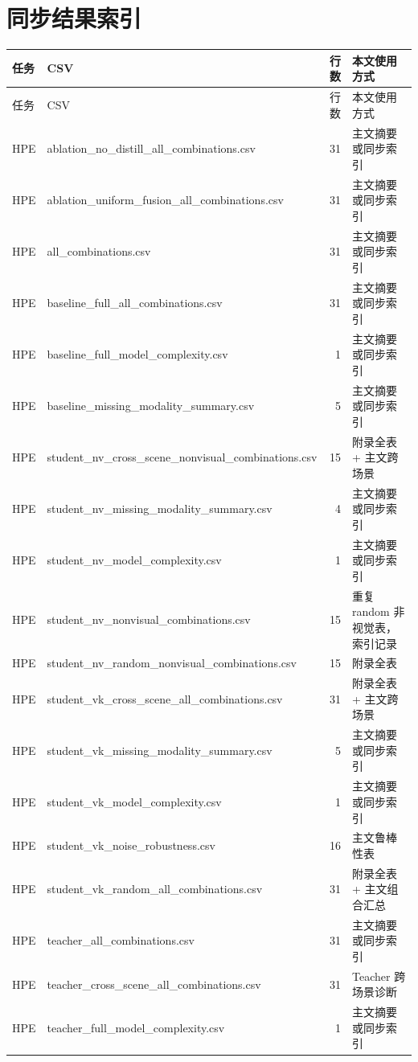 \documentclass[UTF8,10pt]{ctexart}
\begin{document}
\section{同步结果索引}
{\tiny
\begin{longtable}{llrl}
\toprule
任务 & CSV & 行数 & 本文使用方式\\
\midrule
\endfirsthead
\toprule
任务 & CSV & 行数 & 本文使用方式\\
\midrule
\endhead
HPE & ablation\_no\_distill\_all\_combinations.csv & 31 & 主文摘要或同步索引\\
HPE & ablation\_uniform\_fusion\_all\_combinations.csv & 31 & 主文摘要或同步索引\\
HPE & all\_combinations.csv & 31 & 主文摘要或同步索引\\
HPE & baseline\_full\_all\_combinations.csv & 31 & 主文摘要或同步索引\\
HPE & baseline\_full\_model\_complexity.csv & 1 & 主文摘要或同步索引\\
HPE & baseline\_missing\_modality\_summary.csv & 5 & 主文摘要或同步索引\\
HPE & student\_nv\_cross\_scene\_nonvisual\_combinations.csv & 15 & 附录全表 + 主文跨场景\\
HPE & student\_nv\_missing\_modality\_summary.csv & 4 & 主文摘要或同步索引\\
HPE & student\_nv\_model\_complexity.csv & 1 & 主文摘要或同步索引\\
HPE & student\_nv\_nonvisual\_combinations.csv & 15 & 重复 random 非视觉表，索引记录\\
HPE & student\_nv\_random\_nonvisual\_combinations.csv & 15 & 附录全表\\
HPE & student\_vk\_cross\_scene\_all\_combinations.csv & 31 & 附录全表 + 主文跨场景\\
HPE & student\_vk\_missing\_modality\_summary.csv & 5 & 主文摘要或同步索引\\
HPE & student\_vk\_model\_complexity.csv & 1 & 主文摘要或同步索引\\
HPE & student\_vk\_noise\_robustness.csv & 16 & 主文鲁棒性表\\
HPE & student\_vk\_random\_all\_combinations.csv & 31 & 附录全表 + 主文组合汇总\\
HPE & teacher\_all\_combinations.csv & 31 & 主文摘要或同步索引\\
HPE & teacher\_cross\_scene\_all\_combinations.csv & 31 & Teacher 跨场景诊断\\
HPE & teacher\_full\_model\_complexity.csv & 1 & 主文摘要或同步索引\\

\end{longtable}}
\end{document}
